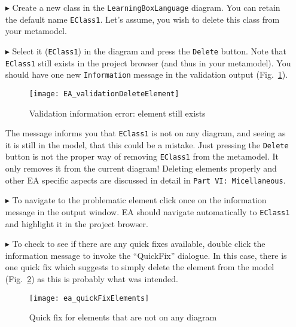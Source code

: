 \begin{enumerate}
\item[$\blacktriangleright$] Create a new class in the \texttt{Learning\-Box\-Language} diagram. You can retain the default name \texttt{EClass1}. Let's assume,
you wish to delete this class from your metamodel.

\item[$\blacktriangleright$] Select it (\texttt{EClass1}) in the diagram and press the \texttt{Delete} button. Note that \texttt{EClass1} still exists in the
project browser (and thus in your metamodel). You should have one new \texttt{Information} message in the validation output
(Fig.~\ref{fig:validation_information}).

\begin{figure}[htbp]
	\centering
  \texttt{[image: EA\_validationDeleteElement]}
	\caption{Validation information error: element still exists}
	\label{fig:validation_information}
\end{figure}

\pagebreak

The message informs you that \texttt{EClass1} is not on any diagram, and seeing as it is still in the model, that this could be a mistake. Just pressing the
\texttt{Delete} button is not the proper way of removing \texttt{EClass1} from the metamodel. It only removes it from the current diagram! Deleting elements
properly and other EA specific aspects are discussed in detail in \texttt{Part VI: Micellaneous}.


\item[$\blacktriangleright$] To navigate to the problematic element click once on the information message in the output window. EA should navigate automatically
to \texttt{EClass1} and highlight it in the project browser.

\item[$\blacktriangleright$] To check to see if there are any quick fixes available, double click the information message to invoke the ``QuickFix'' dialogue.
In this case, there is one quick fix which suggests to simply delete the element from the model (Fig.~\ref{fig:quick-fix1}) as this is probably what was
intended.

\begin{figure}[htbp]
	\centering
  \texttt{[image: ea\_quickFixElements]}
	\caption{Quick fix for elements that are not on any diagram}
	\label{fig:quick-fix1}
\end{figure}
\FloatBarrier


\end{enumerate}

